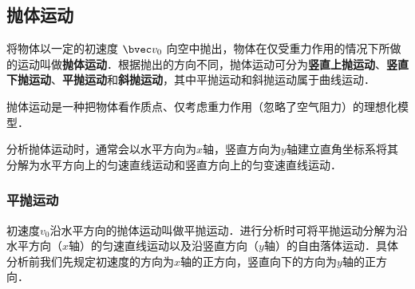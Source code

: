 \subsection{抛体运动}
将物体以一定的初速度 $\bvec v_0$ 向空中抛出，物体在仅受重力作用的情况下所做的运动叫做\textbf{抛体运动}．根据抛出的方向不同，抛体运动可分为\textbf{竖直上抛运动}、\textbf{竖直下抛运动}、\textbf{平抛运动}和\textbf{斜抛运动}，其中平抛运动和斜抛运动属于曲线运动．

抛体运动是一种把物体看作质点、仅考虑重力作用（忽略了空气阻力）的理想化模型．

分析抛体运动时，通常会以水平方向为$x$轴，竖直方向为$y$轴建立直角坐标系将其分解为水平方向上的匀速直线运动和竖直方向上的匀变速直线运动．

\subsubsection{平抛运动}
初速度$v_0$沿水平方向的抛体运动叫做平抛运动．进行分析时可将平抛运动分解为沿水平方向（$x$轴）的匀速直线运动以及沿竖直方向（$y$轴）的自由落体运动．具体分析前我们先规定初速度的方向为$x$轴的正方向，竖直向下的方向为$y$轴的正方向．

